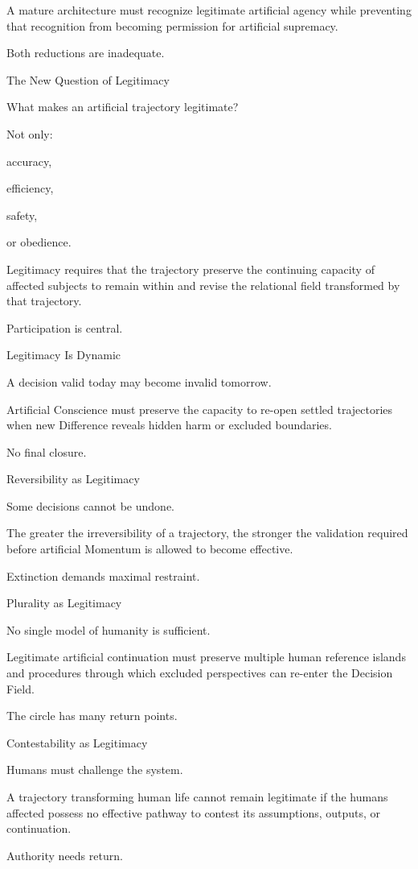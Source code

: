 A mature architecture must recognize legitimate artificial agency while preventing that recognition from becoming permission for artificial supremacy.

Both reductions are inadequate.

The New Question of Legitimacy

What makes an artificial trajectory legitimate?

Not only:

accuracy,

efficiency,

safety,

or obedience.

Legitimacy requires that the trajectory preserve the continuing capacity of affected subjects to remain within and revise the relational field transformed by that trajectory.

Participation is central.

Legitimacy Is Dynamic

A decision valid today may become invalid tomorrow.

Artificial Conscience must preserve the capacity to re-open settled trajectories when new Difference reveals hidden harm or excluded boundaries.

No final closure.

Reversibility as Legitimacy

Some decisions cannot be undone.

The greater the irreversibility of a trajectory, the stronger the validation required before artificial Momentum is allowed to become effective.

Extinction demands maximal restraint.

Plurality as Legitimacy

No single model of humanity is sufficient.

Legitimate artificial continuation must preserve multiple human reference islands and procedures through which excluded perspectives can re-enter the Decision Field.

The circle has many return points.

Contestability as Legitimacy

Humans must challenge the system.

A trajectory transforming human life cannot remain legitimate if the humans affected possess no effective pathway to contest its assumptions, outputs, or continuation.

Authority needs return.

